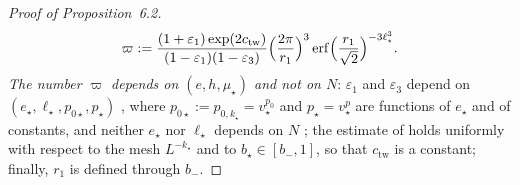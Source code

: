 \documentclass[11pt]{amsart}
\theoremstyle{definition}
\begin{document}
\begin{proof}[Proof of Proposition~6.2]
\begin{equation*}
\varpi:=\frac{(1+\varepsilon_1)\exp(2c_{\mathrm{tw}})}{(1-\varepsilon_1)(1-\varepsilon_3)}\Bigl(\frac{2\pi}{r_1}\Bigr)^3\operatorname{erf}\Bigl(\frac{r_1}{\sqrt2}\Bigr)^{-3\ell_\star^3}.
\end{equation*}
\emph{The number $\varpi$ depends on $(e,h,\mu_\star)$ and not on $N$}:
$\varepsilon_1$ and $\varepsilon_3$ depend on $(e_\star,\ell_\star,p_{0\star},p_\star)$ \cite[Section~G4.0.3]{QEDIII}, where $p_{0\star}:=p_{0,k_\star}=v_\star^{p_0}$ and $p_\star=v_\star^{p}$ are functions of $e_\star$ and of constants, and neither $e_\star$ nor $\ell_\star$ depends on $N$ \cite[Section~G4.0.2, (Sc1)]{QEDIII};
the estimate of \cite[Proposition~30.3\,(e)]{QEDIII} holds uniformly with respect to the mesh $L^{-k_\star}$ and to $b_\star\in[b_-,1]$, so that $c_{\mathrm{tw}}$ is a constant;
finally, $r_1$ is defined through $b_-$.


\end{proof}
\end{document}
